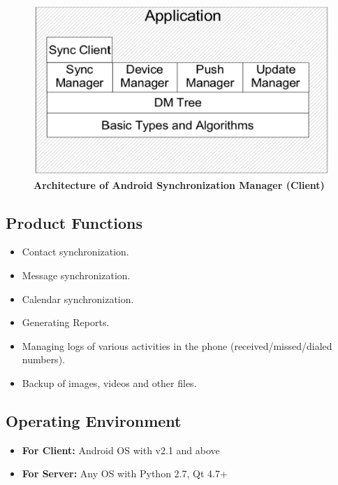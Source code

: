 \begin{figure}[H]
  \centering
    \includegraphics[scale=0.45]{project/images/client-architecture}
  \caption{\textbf{Architecture of Android Synchronization Manager (Client)}}
\end{figure}

\subsection{Product Functions}
\begin{itemize}
 \item Contact synchronization.
 \item Message synchronization.
 \item Calendar synchronization.
 \item Generating Reports.
 \item Managing logs of various activities in the phone (received/missed/dialed numbers).
 \item Backup of images, videos and other files.
\end{itemize}

\subsection{Operating Environment}
\begin{itemize}
 \item \textbf{For Client:} Android OS with v2.1 and above
 \item \textbf{For Server:} Any OS with Python 2.7, Qt 4.7+
\end{itemize}

